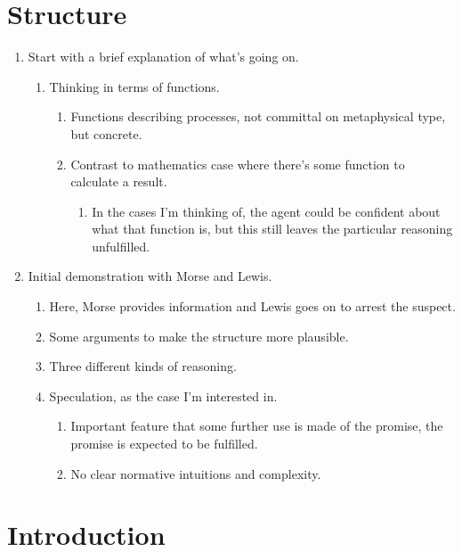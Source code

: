 \documentclass[10pt]{article}
\begin{document}
\section*{Structure}
\label{sec:structure}


\begin{enumerate}
\item Start with a brief explanation of what's going on.
  \begin{enumerate}
  \item Thinking in terms of functions.
    \begin{enumerate}
    \item Functions describing processes, not committal on metaphysical type, but concrete.
    \item Contrast to mathematics case where there's some function to calculate a result.
      \begin{enumerate}
      \item In the cases I'm thinking of, the agent could be confident about what that function is, but this still leaves the particular reasoning unfulfilled.
      \end{enumerate}
    \end{enumerate}
  \end{enumerate}
\item Initial demonstration with Morse and Lewis.
  \begin{enumerate}
  \item Here, Morse provides information and Lewis goes on to arrest the suspect.
  \item Some arguments to make the structure more plausible.
  \item Three different kinds of reasoning.
  \item Speculation, as the case I'm interested in.
    \begin{enumerate}
    \item Important feature that some further use is made of the promise, the promise is expected to be fulfilled.
    \item No clear normative intuitions and complexity.
    \end{enumerate}
  \end{enumerate}
\end{enumerate}

\section{Introduction}
\label{sec:introduction}
\end{document}
